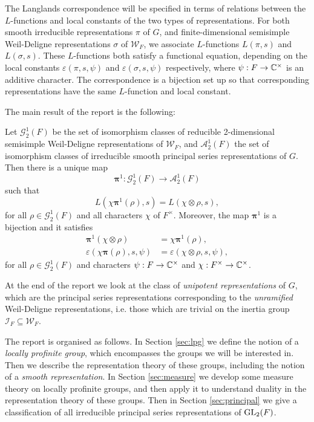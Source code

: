 The Langlands correspondence will be specified in terms of relations between the $L$-functions and local constants of the two types of representations. For both smooth irreducible representations $\pi$ of $G$, and finite-dimensional semisimple Weil-Deligne representations $\sigma$ of $\mathcal{W}_F$, we associate $L$-functions $L(\pi, s)$ and $L(\sigma, s)$. These $L$-functions both satisfy a functional equation, depending on the local constants $\varepsilon(\pi, s, \psi)$ and $\varepsilon(\sigma, s, \psi)$ respectively, where $\psi: F\to \mathbb{C}^\times$ is an additive character. The correspondence is a bijection set up so that corresponding representations have the same $L$-function and local constant.

The main result of the report is the following:
\begin{thm}[ = Theorem \ref{thm:langcorr2}, Langlands correspondence for principal series representations]
    Let $\mathcal{G}_2^1(F)$ be the set of isomorphism classes of reducible 2-dimensional semisimple Weil-Deligne representations of $\mathcal{W}_F$, and $\mathcal{A}_2^1(F)$ the set of isomorphism classes of irreducible smooth principal series representations of $G$. Then there is a unique map
$$\bm\pi^1:\mathcal{G}_2^1(F)\longrightarrow\mathcal{A}_2^1(F)$$
such that 
\begin{equation*}
	L(\chi\bm\pi^1(\rho),s)=L(\chi\otimes\rho,s),
\end{equation*}
for all $\rho\in\mathcal{G}_2^1(F)$ and all characters $\chi$ of $F^\times$. Moreover, the map $\bm\pi^1$ is a bijection and it satisfies
\begin{equation*}
	\begin{split}
		\bm\pi^1(\chi\otimes\rho)&=\chi\bm\pi^1(\rho),\\
		\varepsilon(\chi\bm\pi(\rho),s,\psi)&=\varepsilon(\chi\otimes\rho,s,\psi),
	\end{split}
\end{equation*}
for all $\rho\in\mathcal{G}_2^1(F)$ and characters $\psi:F \to \mathbb{C}^\times$ and $\chi: F^\times \to \mathbb{C}^\times$.
\end{thm}
At the end of the report we look at the class of \emph{unipotent representations} of $G$, which are the principal series representations corresponding to the \emph{unramified} Weil-Deligne representations, i.e. those which are trivial on the inertia group $\mathcal{I}_F\subseteq \mathcal{W}_F$.

The report is organised as follows. In Section \ref{sec:lpg} we define the notion of a \emph{locally profinite group}, which encompasses the groups we will be interested in. Then we describe the representation theory of these groups, including the notion of a \emph{smooth representation}. In Section \ref{sec:measure} we develop some measure theory on locally profinite groups, and then apply it to understand duality in the representation theory of these groups. Then in Section \ref{sec:principal} we give a classification of all irreducible principal series representations of $\mathrm{GL}_2(F)$.

